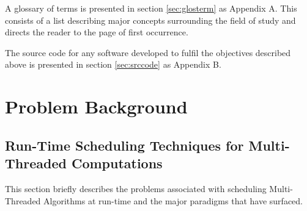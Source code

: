 A glossary of terms is presented in section \ref{sec:glosterm} as Appendix A. 
This consists of a list describing major concepts surrounding the field of study and directs the reader to the page of first occurrence. 

The source code for any software developed to fulfil the objectives described above is presented in section \ref{sec:srccode} as Appendix B.







\chapter{Problem Background}

\section{Run-Time Scheduling Techniques for Multi-Threaded Computations}
This section briefly describes the problems associated with scheduling Multi-Threaded Algorithms at run-time and
the major paradigms that have surfaced.

